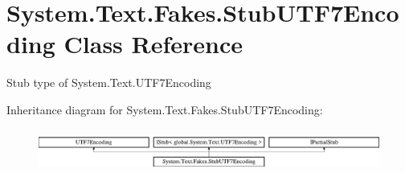\hypertarget{class_system_1_1_text_1_1_fakes_1_1_stub_u_t_f7_encoding}{\section{System.\-Text.\-Fakes.\-Stub\-U\-T\-F7\-Encoding Class Reference}
\label{class_system_1_1_text_1_1_fakes_1_1_stub_u_t_f7_encoding}
}


Stub type of System.\-Text.\-U\-T\-F7\-Encoding 


Inheritance diagram for System.\-Text.\-Fakes.\-Stub\-U\-T\-F7\-Encoding\-:\begin{figure}[H]
\begin{center}
\leavevmode
\includegraphics[height=1.414141cm]{class_system_1_1_text_1_1_fakes_1_1_stub_u_t_f7_encoding}
\end{center}
\end{figure}
